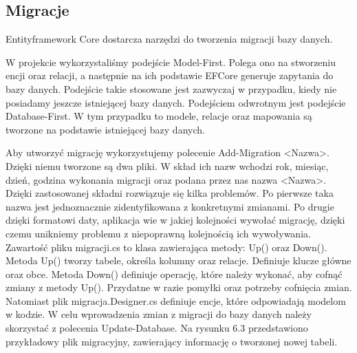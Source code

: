 \documentclass[a4paper,twoside,12pt]{book}
\begin{document}
\subsection{Migracje}
Entityframework Core dostarcza narzędzi do tworzenia migracji bazy danych.  

W projekcie wykorzystaliśmy podejście Model-First. Polega ono na stworzeniu encji oraz relacji, a następnie na ich podstawie EFCore generuje zapytania do bazy danych. Podejście takie stosowane jest zazwyczaj w przypadku, kiedy nie posiadamy jeszcze istniejącej bazy danych. Podejściem odwrotnym jest podejście Database-First. W tym przypadku to modele, relacje oraz mapowania są tworzone na podstawie istniejącej bazy danych. 

Aby utworzyć migrację wykorzystujemy polecenie Add-Migration <Nazwa>. Dzięki niemu tworzone są dwa pliki. W skład ich nazw wchodzi rok, miesiąc, dzień, godzina wykonania migracji oraz podana przez nas nazwa <Nazwa>. Dzięki zastosowanej składni rozwiązuje się kilka problemów. Po pierwsze taka nazwa jest jednoznacznie zidentyfikowana z konkretnymi zmianami. Po drugie dzięki formatowi daty, aplikacja wie w jakiej kolejności wywołać migrację, dzięki czemu unikniemy problemu z niepoprawną kolejnością ich wywoływania. 
Zawartość pliku migracji.cs to klasa zawierająca metody: Up() oraz Down(). Metoda Up() tworzy tabele, określa kolumny oraz relacje. Definiuje klucze główne oraz obce. Metoda Down() definiuje operację, które należy wykonać, aby cofnąć zmiany z metody Up(). Przydatne w razie pomyłki oraz potrzeby cofnięcia zmian.
Natomiast plik migracja.Designer.cs definiuje encje, które odpowiadają modelom w kodzie.
W celu wprowadzenia zmian z migracji do bazy danych należy skorzystać z polecenia Update-Database. Na rysunku 6.3 przedstawiono przykładowy plik migracyjny, zawierający informację o tworzonej nowej tabeli.
\end{document}
